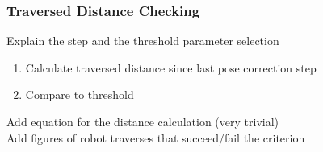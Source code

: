 \subsubsection{Traversed Distance Checking}

Explain the step and the threshold parameter selection

\begin{enumerate}
    \item Calculate traversed distance since last pose correction step
    \item Compare to threshold
\end{enumerate}

\noindent
Add equation for the distance calculation (very trivial)\\
Add figures of robot traverses that succeed/fail the criterion

